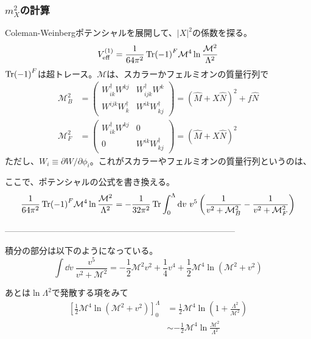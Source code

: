 \documentclass[
  unicode,a4paper,9pt,
  xcolor = {dvipsnames,svgnames},
  hyperref ={colorlinks=true,citecolor=Navy,linkcolor=NavyBlue,urlcolor=purple},
  ja=standard,lualatex
]{beamer}
\begin{document}
\begin{frame}
  \frametitle{\texorpdfstring{$m_{X}^2$}{mX^2}の計算}

  Coleman-Weinbergポテンシャルを展開して、$|X|^2$の係数を探る。
  \begin{equation}
    V_{\textrm{eff}}^{(1)}
    =
    \frac{1}{64\pi^2}
    \Tr (-1)^{F}
    \mathcal{M}^{4}\ln\frac{\mathcal{M}^2}{\Lambda^{2}}
    \nonumber
  \end{equation}
  $\Tr (-1)^{F}$は超トレース。$\mathcal{M}$は、スカラーかフェルミオンの質量行列で
  \begin{align}
    \mathcal{M}_{B}^2
     & =
    \begin{pmatrix}
      W^{\dag}_{ik}W^{kj} & W^{\dag}_{ijk}W^{k} \\
      W^{ijk}W_{k}^{\dag} & W^{ik}W_{kj}^{\dag}
    \end{pmatrix}
    =
    (\hat{M}+X\hat{N})^2+f\hat{N}
    \nonumber
    \\
    \mathcal{M}_{F}^2
     & =
    \begin{pmatrix}
      W^{\dag}_{ik}W^{kj} & 0                   \\
      0                   & W^{ik}W_{kj}^{\dag}
    \end{pmatrix}
    =
    (\hat{M}+X\hat{N})^2
    \nonumber
  \end{align}
  ただし、$W_{i}\equiv\partial W/\partial\phi_{i}$。これがスカラーやフェルミオンの質量行列というのは、

\end{frame}


\begin{frame}

  ここで、ポテンシャルの公式を書き換える。
  \begin{equation}    
    \frac{1}{64\pi^2}
    \Tr (-1)^{F}
    \mathcal{M}^{4}\ln\frac{\mathcal{M}^2}{\Lambda^{2}}
    =
    -\frac{1}{32\pi^2}
    \Tr\int^{\Lambda}_{0}\dd v\ 
    v^5\left( \frac{1}{v^2+\mathcal{M}_{B}^2}-\frac{1}{v^2+\mathcal{M}_{F}^2} \right)
    \nonumber
  \end{equation}
  
  ---------------------------------------------------------------------------------

  積分の部分は以下のようになっている。
  \begin{equation}
    \int\dd v\ 
    \frac{v^5}{v^2+\mathcal{M}^2}
    =
    -\frac{1}{2}\mathcal{M}^2 v^2
    +
    \frac{1}{4}v^4
    +
    \frac{1}{2}\mathcal{M}^4\ln(\mathcal{M}^2+v^2)
    \nonumber
  \end{equation}

  あとは$\ln \Lambda^2$で発散する項をみて
  \begin{align}
    \left[  
      \frac{1}{2}\mathcal{M}^4\ln(\mathcal{M}^2+v^2)      
    \right]_{0}^{\Lambda}
    &=
    \frac{1}{2}\mathcal{M}^4\ln\left( 1+\frac{\Lambda^2}{\mathcal{M}^2} \right)
    \nonumber
    \\
    &\sim
    -
    \frac{1}{2}\mathcal{M}^4\ln\frac{\mathcal{M}^2}{\Lambda^2}
    \nonumber
  \end{align}

\end{frame}
\end{document}
